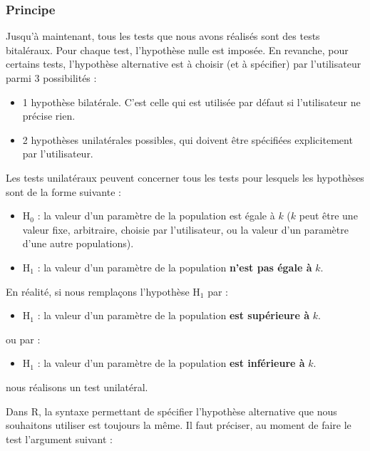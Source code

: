 \documentclass[
  a4paper,
]{article}
\providecommand{\tightlist}{%
  \setlength{\itemsep}{0pt}\setlength{\parskip}{0pt}}
\begin{document}
\hypertarget{principe}{%
\subsubsection{Principe}\label{principe}}

Jusqu'à maintenant, tous les tests que nous avons réalisés sont des tests bitaléraux. Pour chaque test, l'hypothèse nulle est imposée. En revanche, pour certains tests, l'hypothèse alternative est à choisir (et à spécifier) par l'utilisateur parmi 3 possibilités :

\begin{itemize}
\tightlist
\item
  1 hypothèse bilatérale. C'est celle qui est utilisée par défaut si l'utilisateur ne précise rien.
\item
  2 hypothèses unilatérales possibles, qui doivent être spécifiées explicitement par l'utilisateur.
\end{itemize}

Les tests unilatéraux peuvent concerner tous les tests pour lesquels les hypothèses sont de la forme suivante :

\begin{itemize}
\tightlist
\item
  H\(_0\) : la valeur d'un paramètre de la population est égale à \(k\) (\(k\) peut être une valeur fixe, arbitraire, choisie par l'utilisateur, ou la valeur d'un paramètre d'une autre populations).
\item
  H\(_1\) : la valeur d'un paramètre de la population \textbf{n'est pas égale à} \(k\).
\end{itemize}

En réalité, si nous remplaçons l'hypothèse H\(_1\) par :

\begin{itemize}
\tightlist
\item
  H\(_1\) : la valeur d'un paramètre de la population \textbf{est supérieure à} \(k\).
\end{itemize}

ou par :

\begin{itemize}
\tightlist
\item
  H\(_1\) : la valeur d'un paramètre de la population \textbf{est inférieure à} \(k\).
\end{itemize}

nous réalisons un test unilatéral.

Dans R, la syntaxe permettant de spécifier l'hypothèse alternative que nous souhaitons utiliser est toujours la même. Il faut préciser, au moment de faire le test l'argument suivant :
\end{document}
